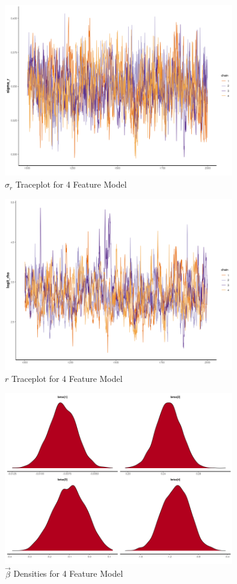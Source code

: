 \documentclass[11pt]{article}
\begin{document}
\begin{figure}[h!] 
	\centering
  \includegraphics[height=75mm]{traceplot_sigma_r.png}
  \caption{$\sigma_r$ Traceplot for 4 Feature Model}
  \label{fig:tsigma_r}
\end{figure}

\begin{figure}[h!] 
	\centering
  \includegraphics[height=75mm]{traceplot_logit_rho.png}
  \caption{$r$ Traceplot for 4 Feature Model}
  \label{fig:tlogit_rho}
\end{figure}



\begin{figure}[h!] 
	\centering
  \includegraphics[height=75mm]{density_betas.png}
  \caption{$\vec{\beta}$ Densities for 4 Feature Model}
  \label{fig:dbetas}
\end{figure}
\end{document}
